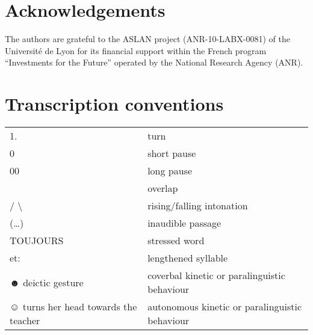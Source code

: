 \documentclass[output=paper]{langscibook}
\begin{document}
\section*{Acknowledgements}
The authors are grateful to the ASLAN project (ANR-10-LABX-0081) of the Université de Lyon for its financial support within the French program “Investments for the Future” operated by the National Research Agency (ANR).

\section*{Transcription conventions}\label{14:conventions}

\begin{tabularx}{\textwidth}{@{}Ql@{}}
1.&turn\\
0&short pause\\
00&long pause\\\relax
[  ]&overlap\\
/ {\textbackslash}&rising/falling intonation\\
(…)&inaudible passage\\
TOUJOURS&stressed word\\
et: &lengthened syllable\\
☻ deictic gesture  & coverbal kinetic or paralinguistic behaviour\\
☺ turns her head towards the teacher & autonomous kinetic or paralinguistic behaviour\\
\end{tabularx}

{\sloppy\printbibliography[heading=subbibliography,notkeyword=this]}
\end{document}
